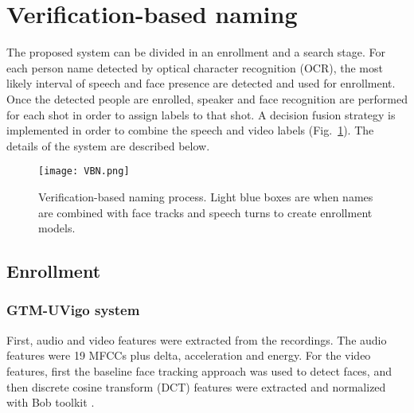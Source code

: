 \section{Verification-based naming}
\label{sec:verification}


The proposed system can be divided in an enrollment and a search stage. For each person name detected by optical character recognition (OCR), the most likely interval
of speech and face presence are detected and used for enrollment.
Once the detected people are enrolled, speaker and face recognition
are performed for each shot in order to assign labels to that shot. 
A decision fusion strategy is implemented in order to combine the speech and video labels (Fig.~\ref{fig:vbn}). The details of the system
are described below.

\begin{figure}[!htb]
 \centering
 \texttt{[image: VBN.png]}
\vspace*{-5mm}
 \caption{Verification-based naming process. Light blue boxes are when names are combined with face tracks and speech turns to create enrollment models.}
\vspace*{-5mm}
 \label{fig:vbn}
\end{figure}

\subsection{Enrollment}

\subsubsection{GTM-UVigo system}
First, audio and video features were extracted from the recordings. The audio features were 19 MFCCs plus delta, acceleration and energy. For the video features, first
the baseline face tracking approach was used to detect faces, and then discrete cosine transform (DCT) features \cite{mccool2009} were extracted and normalized with Bob toolkit \cite{bob2012}.

